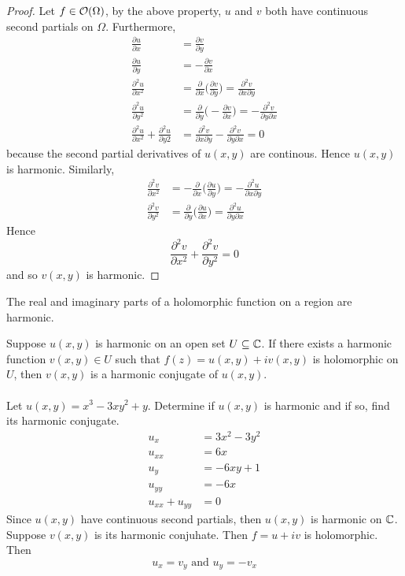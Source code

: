 \documentclass[12pt]{article}
\begin{document}
 \begin{proof} Let $f \in \mathcal{O}(\Omega)$, by the above property, $u$ and $v$ both have continuous second partials on $\Omega$. Furthermore, $$ \begin{aligned} 
 \frac{\partial u}{\partial x} &= \frac{\partial v}{\partial y} \\ \frac{\partial u}{\partial y} &= -\frac{\partial v}{\partial x} \\ \frac{\partial^2 u}{\partial x^2} &= \frac{\partial}{\partial x} \Big( \frac{\partial v}{\partial y} \Big) = \frac{\partial^2 v}{\partial x\partial y} \\ 
 \frac{\partial^2 u}{\partial y^2} &= \frac{\partial}{\partial y} \Big( -\frac{\partial v}{\partial x} \Big) = -\frac{\partial^2v}{\partial y \partial x} \\ \frac{\partial^2u}{\partial x^2} + \frac{\partial^2u}{\partial y2} &= \frac{\partial^2v}{\partial x \partial y} - \frac{\partial^2 v}{\partial y \partial x} =  0 \end{aligned} $$ because the second partial derivatives of $u(x,y)$ are continous. Hence $u(x,y)$ is harmonic. Similarly, $$ \begin{aligned} 
 \frac{\partial^2v}{\partial x^2} &= -\frac{\partial}{\partial x} \Big( \frac{\partial u}{\partial y} \Big) = -\frac{\partial^2 u}{\partial x \partial y} \\ \frac{\partial^2 v}{\partial y^2} &= \frac{\partial}{\partial y} \Big( \frac{\partial u}{\partial x} \Big) = \frac{\partial^2 u}{\partial y \partial x} \end{aligned} $$ 
 Hence $$ \frac{\partial^2 v}{\partial x^2} + \frac{\partial^2 v}{\partial y^2} = 0$$ and so $v(x,y)$ is harmonic. \end{proof} 
\begin{theorem} The real and imaginary parts of a holomorphic function on a region are harmonic. \end{theorem} 
Suppose $u(x,y)$ is harmonic on an open set $U \subseteq \mathbb{C}$. If there exists a harmonic function $v(x,y) \in U$ such that $f(z) = u(x,y) + iv(x,y)$ is holomorphic on $U$, then $v(x,y)$ is a harmonic conjugate of $u(x,y)$. \\~\\
Let $u(x,y) = x^3 - 3xy^2 + y$. Determine if $u(x,y)$ is harmonic and if so, find its harmonic conjugate. 
$$\begin{aligned} u_x &= 3x^2 - 3y^2 \\ u_{xx} &= 6x \\ u_y &= -6xy + 1 \\ u_{yy} &= -6x \\ u_{xx} + u_{yy} &= 0 \end{aligned} $$ Since $u(x,y)$ have continuous second partials, then $u(x,y)$ is harmonic on $\mathbb{C}$. Suppose $v(x,y)$ is its harmonic conjuhate. Then $f = u + iv$ is holomorphic. Then $$ u_x = v_y \text{ and } u_y = -v_x$$ 
\end{document}
